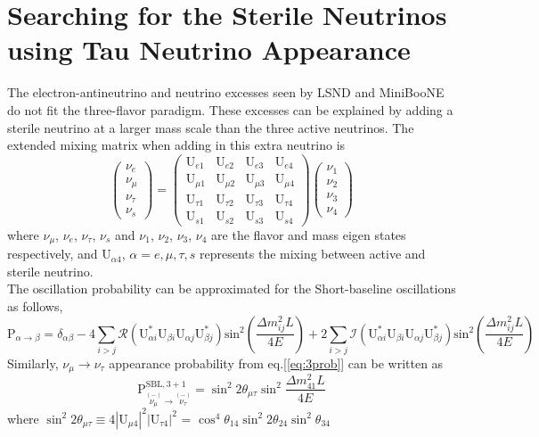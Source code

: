 \documentclass[12pt]{article}
\begin{document}
\section{Searching  for the Sterile Neutrinos using Tau Neutrino Appearance}
The electron-antineutrino and neutrino excesses seen by LSND \cite{LSND} and MiniBooNE \cite{MiniBooNE}\cite{MiniBooNE1} do not fit the three-flavor paradigm. These excesses can be explained by adding a sterile neutrino at a larger mass scale than the three active neutrinos. The extended mixing matrix when adding in this extra neutrino is
\begin{equation}
\left(
\begin{matrix}
\nu_{e} \\
\nu_{\mu} \\
\nu_{\tau} \\
\nu_{s} 
\end{matrix} \right) = 
\left(
\begin{matrix}
\text{U}_{e1} & \text{U}_{e2} & \text{U}_{e3}& \text{U}_{e4} \\
\text{U}_{\mu1} & \text{U}_{\mu2} & \text{U}_{\mu3}& \text{U}_{\mu4} \\
\text{U}_{\tau1} & \text{U}_{\tau2} & \text{U}_{\tau3}& \text{U}_{\tau4} \\
\text{U}_{s1} & \text{U}_{s2} & \text{U}_{s3}& \text{U}_{s4} 
\end{matrix} \right)
\left(
\begin{matrix}
\nu_{1} \\
\nu_{2} \\
\nu_{3} \\
\nu_{4} 
\end{matrix} \right)
\end{equation}
where $\nu_{\mu}$, $\nu_{e}$, $\nu_{\tau}$, $\nu_{s}$ and $\nu_{1}$, $\nu_{2}$, $\nu_{3}$, $\nu_{4}$ are the flavor and mass eigen states respectively, and U$_{\alpha4}$, $\alpha=e, \mu, \tau, s$ represents the mixing between active and sterile neutrino. \\
The oscillation probability can be approximated for the Short-baseline oscillations as follows,
\begin{equation}
\text{P}_{\alpha \rightarrow \beta} = \delta_{\alpha\beta} - 4\sum_{i > j}\mathcal{R}(\text{U}^{*}_{\alpha i}\text{U}_{\beta i}\text{U}_{\alpha j}\text{U}^{*}_{\beta j})\text{sin}^{2}\left(\frac{\Delta m^{2}_{ij}L}{4E}\right)  +  2\sum_{i > j}\mathcal{I}(\text{U}^{*}_{\alpha i}\text{U}_{\beta i}\text{U}_{\alpha j}\text{U}^{*}_{\beta j})\text{sin}^{2}\left(\frac{\Delta m^{2}_{ij}L}{4E}\right)
\label{eq:3prob}
\end{equation}
\noindent Similarly, $\nu_{\mu} \rightarrow \nu_{\tau}$  appearance probability from eq.[\ref{eq:3prob}] can be written as
\begin{equation}\label{eqn:disapp_prob}
\text{P}^{\text{SBL},3+1}_{\overset{(-)}{\nu_{\mu}}\rightarrow \overset{(-)}{\nu_{\tau}}} =  \sin^2{2\theta_{\mu\tau}}\sin^2{\frac{\Delta m^2_{41}L}{4E}}
\end{equation} 
where $\sin^2{2\theta_{\mu\tau}} \equiv 4|\text{U}_{\mu4}|^{2}|\text{U}_{\tau4}|^{2}$ = $\cos^{4}\theta_{14} \sin^{2}2\theta_{24}\sin^{2}\theta_{34}$
\end{document}
